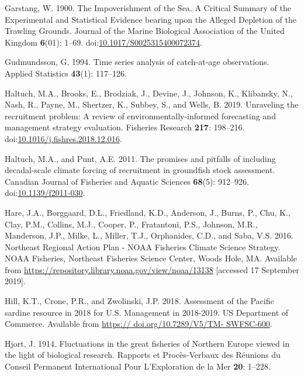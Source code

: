 \documentclass[]{article}
\begin{document}
\leavevmode\hypertarget{ref-garstang1900Impoverishment}{}%
Garstang, W. 1900. The Impoverishment of the Sea. A Critical Summary of
the Experimental and Statistical Evidence bearing upon the Alleged
Depletion of the Trawling Grounds. Journal of the Marine Biological
Association of the United Kingdom \textbf{6}(01): 1--69.
doi:\href{https://doi.org/10.1017/S0025315400072374}{10.1017/S0025315400072374}.

\leavevmode\hypertarget{ref-gudmundsson1994Time}{}%
Gudmundsson, G. 1994. Time series analysis of catch-at-age observations.
Applied Statistics \textbf{43}(1): 117--126.

\leavevmode\hypertarget{ref-haltuch2019Unraveling}{}%
Haltuch, M.A., Brooks, E., Brodziak, J., Devine, J., Johnson, K.,
Klibansky, N., Nash, R., Payne, M., Shertzer, K., Subbey, S., and Wells,
B. 2019. Unraveling the recruitment problem: A review of
environmentally-informed forecasting and management strategy evaluation.
Fisheries Research \textbf{217}: 198--216.
doi:\href{https://doi.org/10.1016/j.fishres.2018.12.016}{10.1016/j.fishres.2018.12.016}.

\leavevmode\hypertarget{ref-haltuch2011Promises}{}%
Haltuch, M.A., and Punt, A.E. 2011. The promises and pitfalls of
including decadal-scale climate forcing of recruitment in groundfish
stock assessment. Canadian Journal of Fisheries and Aquatic Sciences
\textbf{68}(5): 912--926.
doi:\href{https://doi.org/10.1139/f2011-030}{10.1139/f2011-030}.

\leavevmode\hypertarget{ref-hare2016Northeast}{}%
Hare, J.A., Borggaard, D.L., Friedland, K.D., Anderson, J., Burns, P.,
Chu, K., Clay, P.M., Collins, M.J., Cooper, P., Fratantoni, P.S.,
Johnson, M.R., Manderson, J.P., Milke, L., Miller, T.J., Orphanides,
C.D., and Saba, V.S. 2016. Northeast Regional Action Plan - NOAA
Fisheries Climate Science Strategy. NOAA Fisheries, Northeast Fisheries
Science Center, Woods Hole, MA. Available from
\url{https://repository.library.noaa.gov/view/noaa/13138} {[}accessed 17
September 2019{]}.

\leavevmode\hypertarget{ref-hill2018Assessment}{}%
Hill, K.T., Crone, P.R., and Zwolinski, J.P. 2018. Assessment of the
Pacific sardine resource in 2018 for U.S. Management in 2018-2019. US
Department of Commerce. Available from
\href{https://\%20doi.org/10.7289/V5/TM-\%20SWFSC-600}{https:// doi.org/10.7289/V5/TM- SWFSC-600}.

\leavevmode\hypertarget{ref-hjort1914Fluctuations}{}%
Hjort, J. 1914. Fluctuations in the great fisheries of Northern Europe
viewed in the light of biological research. Rapports et Procès-Verbaux
des Réunions du Conseil Permanent International Pour L'Exploration de la
Mer \textbf{20}: 1--228.
\end{document}
